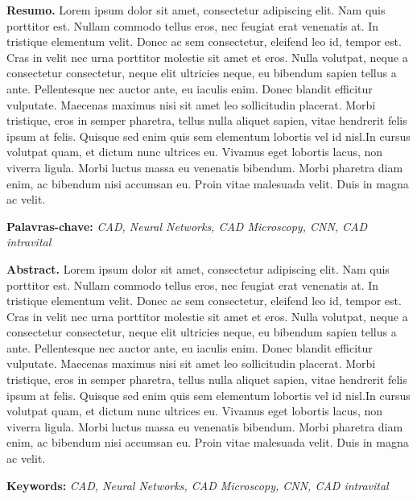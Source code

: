 \renewcommand{\baselinestretch}{0.6666666}
{\bf Resumo.} Lorem ipsum dolor sit amet, consectetur adipiscing elit. Nam quis porttitor est. Nullam commodo tellus eros, nec feugiat erat venenatis at. In tristique elementum velit. Donec ac sem consectetur, eleifend leo id, tempor est. Cras in velit nec urna porttitor molestie sit amet et eros. Nulla volutpat, neque a consectetur consectetur, neque elit ultricies neque, eu bibendum sapien tellus a ante. Pellentesque nec auctor ante, eu iaculis enim. Donec blandit efficitur vulputate. Maecenas maximus nisi sit amet leo sollicitudin placerat. Morbi tristique, eros in semper pharetra, tellus nulla aliquet sapien, vitae hendrerit felis ipsum at felis. Quisque sed enim quis sem elementum lobortis vel id nisl.In cursus volutpat quam, et dictum nunc ultrices eu. Vivamus eget lobortis lacus, non viverra ligula. Morbi luctus massa eu venenatis bibendum. Morbi pharetra diam enim, ac bibendum nisi accumsan eu. Proin vitae malesuada velit. Duis in magna ac velit.
\begin{flushleft}
{\bf Palavras-chave:} {\it CAD, Neural Networks, CAD Microscopy, CNN, CAD intravital}
\\[2.5cm]
\end{flushleft}


{\bf Abstract.} Lorem ipsum dolor sit amet, consectetur adipiscing elit. Nam quis porttitor est. Nullam commodo tellus eros, nec feugiat erat venenatis at. In tristique elementum velit. Donec ac sem consectetur, eleifend leo id, tempor est. Cras in velit nec urna porttitor molestie sit amet et eros. Nulla volutpat, neque a consectetur consectetur, neque elit ultricies neque, eu bibendum sapien tellus a ante. Pellentesque nec auctor ante, eu iaculis enim. Donec blandit efficitur vulputate. Maecenas maximus nisi sit amet leo sollicitudin placerat. Morbi tristique, eros in semper pharetra, tellus nulla aliquet sapien, vitae hendrerit felis ipsum at felis. Quisque sed enim quis sem elementum lobortis vel id nisl.In cursus volutpat quam, et dictum nunc ultrices eu. Vivamus eget lobortis lacus, non viverra ligula. Morbi luctus massa eu venenatis bibendum. Morbi pharetra diam enim, ac bibendum nisi accumsan eu. Proin vitae malesuada velit. Duis in magna ac velit.\begin{flushleft}
{\bf Keywords:} {\it CAD, Neural Networks, CAD Microscopy, CNN, CAD intravital}
\end{flushleft}
